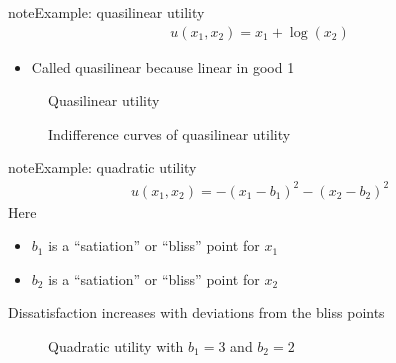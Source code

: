 \documentclass[letterpaper,10pt,english]{jupyterBook}
\begin{document}
\begin{sphinxadmonition}{note}{Example: quasi\sphinxhyphen{}linear utility}
\begin{equation*}
\begin{split}
u(x_1, x_2) = x_1 + \log(x_2)
\end{split}
\end{equation*}\begin{itemize}
\item {} 
\sphinxAtStartPar
Called quasi\sphinxhyphen{}linear because linear in good 1

\end{itemize}
\end{sphinxadmonition}

\begin{figure}[htbp]
\centering
\capstart

\noindent{}
\caption{Quasi\sphinxhyphen{}linear utility}\label{\detokenize{02.optimization_intro:id13}}\end{figure}

\begin{figure}[htbp]
\centering
\capstart

\noindent{}
\caption{Indifference curves of quasi\sphinxhyphen{}linear utility}\label{\detokenize{02.optimization_intro:id14}}\end{figure}

\begin{sphinxadmonition}{note}{Example: quadratic utility}
\begin{equation*}
\begin{split}
u(x_1, x_2) = - (x_1 - b_1)^2 - (x_2 - b_2)^2
\end{split}
\end{equation*}
\sphinxAtStartPar
Here
\begin{itemize}
\item {} 
\sphinxAtStartPar
\(b_1\) is a “satiation” or “bliss” point for \(x_1\)

\item {} 
\sphinxAtStartPar
\(b_2\) is a “satiation” or “bliss” point for \(x_2\)

\end{itemize}
\end{sphinxadmonition}

\sphinxAtStartPar
Dissatisfaction increases with deviations from the bliss points

\begin{figure}[htbp]
\centering
\capstart

\noindent{}
\caption{Quadratic utility with \(b_1 = 3\) and \(b_2 = 2\)}\label{\detokenize{02.optimization_intro:id15}}\end{figure}
\end{document}
